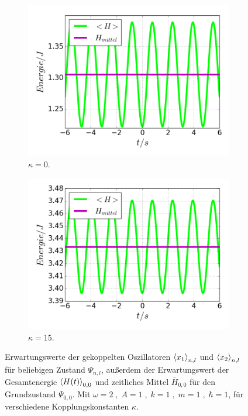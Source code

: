 \begin{figure}
      \begin{subfigure}[t]{0.5\textwidth}
        \centering
        \includegraphics[width=\textwidth]{plots/<H>00_kappa0.png}
        \caption{$\kappa=0$.}
        \label{fig:H_kappa0}
      \end{subfigure}
      \begin{subfigure}[t]{0.5\textwidth}
          \centering
          \includegraphics[width=\textwidth]{plots/<H>00_kappa15.png}
          \caption{$\kappa=15$.}
          \label{fig:H_kappa15}
      \end{subfigure}
      \caption{Erwartungswerte der gekoppelten Oszillatoren $\braket{x_1}_{n,l}$ und $\braket{x_2}_{n,l}$ für beliebigen Zustand $\Psi_{n,l}$, außerdem der Erwartungswert der Gesamtenergie $\braket{H(t)}_{0,0}$ und zeitliches Mittel $\overline{H}_{0,0}$ für den Grundzustand $\Psi_{0,0}$. Mit $\omega=2 \;,\; A=1 \;,\; k=1 \;,\; m=1 \;,\; \hbar=1$, für verschiedene Kopplungskonstanten $\kappa$.}
      \label{ferg}
    \end{figure}
